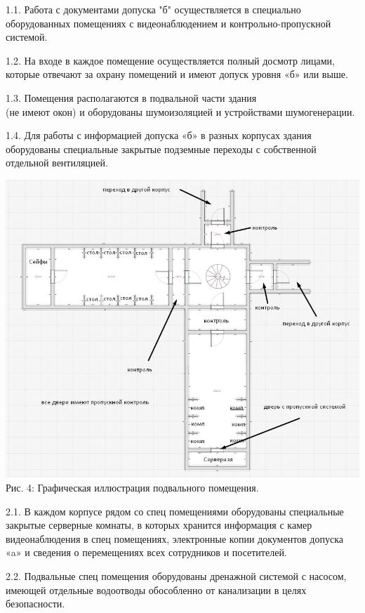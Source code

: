 \documentclass[utf8,14pt,a4paper,oneside,russian]{book}
\begin{document}
1.1. Работа с документами допуска "б" осуществляется в специально оборудованных
помещениях с видеонаблюдением и контрольно-пропускной системой.

1.2. На входе в каждое помещение осуществляется полный досмотр лицами,
которые отвечают за охрану помещений и имеют допуск уровня «б» или выше.

1.3. Помещения располагаются в подвальной части здания\\
(не имеют окон) и оборудованы шумоизоляцией и устройствами шумогенерации.

1.4. Для работы с информацией допуска «б» в разных корпусах здания
оборудованы специальные закрытые подземные переходы с собственной отдельной вентиляцией.


\begin{center}
  \includegraphics[scale=0.7]{shem3}\\

  Рис. 4: Графическая иллюстрация подвального помещения.\\
\end{center}

2.1. В каждом корпусе рядом со спец помещениями оборудованы специальные
закрытые серверные комнаты, в которых хранится информация с камер
видеонаблюдения в спец помещениях, электронные копии документов
допуска «a» и сведения о перемещениях всех сотрудников и посетителей.

2.2. Подвальные спец помещения оборудованы дренажной системой с насосом,
имеющей отдельные водоотводы обособленно от канализации в целях безопасности.
\end{document}
